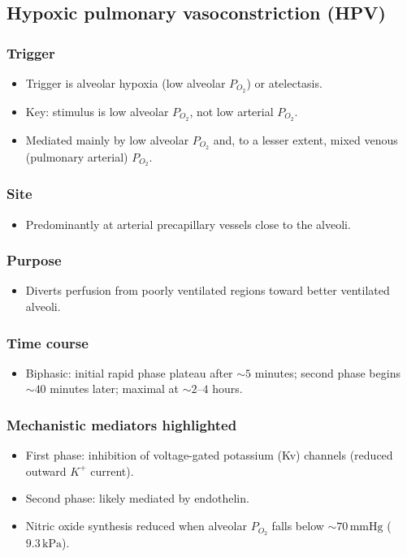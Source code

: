 \documentclass[11pt,a4paper]{article}
\begin{document}
\subsection{Hypoxic pulmonary vasoconstriction (HPV)}
\subsubsection{Trigger}
\begin{itemize}
  \item Trigger is alveolar hypoxia (low alveolar \(P_{O_2}\)) or atelectasis.
  \item Key: stimulus is low alveolar \(P_{O_2}\), not low arterial \(P_{O_2}\).
  \item Mediated mainly by low alveolar \(P_{O_2}\) and, to a lesser extent, mixed venous (pulmonary arterial) \(P_{O_2}\).
\end{itemize}

\subsubsection{Site}
\begin{itemize}
  \item Predominantly at arterial precapillary vessels close to the alveoli.
\end{itemize}

\subsubsection{Purpose}
\begin{itemize}
  \item Diverts perfusion from poorly ventilated regions toward better ventilated alveoli.
\end{itemize}

\subsubsection{Time course}
\begin{itemize}
  \item Biphasic: initial rapid phase plateau after \(\sim 5\) minutes; second phase begins \(\sim 40\) minutes later; maximal at \(\sim 2\text{--}4\) hours.
\end{itemize}

\subsubsection{Mechanistic mediators highlighted}
\begin{itemize}
  \item First phase: inhibition of voltage-gated potassium (Kv) channels (reduced outward \(K^+\) current).
  \item Second phase: likely mediated by endothelin.
  \item Nitric oxide synthesis reduced when alveolar \(P_{O_2}\) falls below \(\sim 70\,\mathrm{mmHg}\) (\(9.3\,\mathrm{kPa}\)).
\end{itemize}
\end{document}

